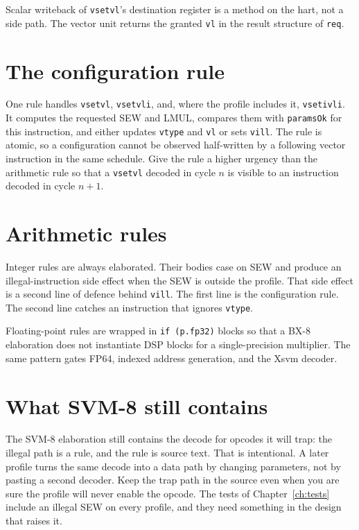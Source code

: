 Scalar writeback of \texttt{vsetvl}'s destination register is a method on the hart, not a side path. The vector unit returns the granted \texttt{vl} in the result structure of \texttt{req}.

\section{The configuration rule}

One rule handles \texttt{vsetvl}, \texttt{vsetvli}, and, where the profile includes it, \texttt{vsetivli}. It computes the requested SEW and LMUL, compares them with \texttt{paramsOk} for this instruction, and either updates \texttt{vtype} and \texttt{vl} or sets \texttt{vill}. The rule is atomic, so a configuration cannot be observed half-written by a following vector instruction in the same schedule. Give the rule a higher urgency than the arithmetic rule so that a \texttt{vsetvl} decoded in cycle $n$ is visible to an instruction decoded in cycle $n+1$.

\section{Arithmetic rules}

Integer rules are always elaborated. Their bodies case on SEW and produce an illegal-instruction side effect when the SEW is outside the profile. That side effect is a second line of defence behind \texttt{vill}. The first line is the configuration rule. The second line catches an instruction that ignores \texttt{vtype}.

Floating-point rules are wrapped in \texttt{if (p.fp32)} blocks so that a BX-8 elaboration does not instantiate DSP blocks for a single-precision multiplier. The same pattern gates FP64, indexed address generation, and the Xsvm decoder.

\section{What SVM-8 still contains}

The SVM-8 elaboration still contains the decode for opcodes it will trap: the illegal path is a rule, and the rule is source text. That is intentional. A later profile turns the same decode into a data path by changing parameters, not by pasting a second decoder. Keep the trap path in the source even when you are sure the profile will never enable the opcode. The tests of Chapter~\ref{ch:tests} include an illegal SEW on every profile, and they need something in the design that raises it.
